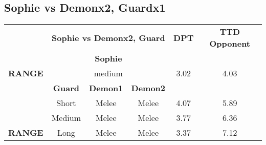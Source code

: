 \subsection{Sophie vs Demonx2, Guardx1}
\begin{table}[H]
\begin{tabular}{c|c|c|c|c|c|}
\cline{2-6}
\rowcolor[HTML]{C0C0C0} 
\cellcolor[HTML]{FFFFFF}\textbf{} & \multicolumn{3}{c|}{\cellcolor[HTML]{C0C0C0}\textbf{Sophie vs Demonx2, Guard}} & \textbf{DPT} & \textbf{TTD Opponent} \\ \cline{2-6} 
 & \multicolumn{3}{c|}{\textbf{Sophie}} & \multicolumn{2}{c|}{} \\ \hline
\multicolumn{1}{|c|}{\cellcolor[HTML]{C0C0C0}\textbf{RANGE}} & \multicolumn{3}{c|}{medium} & 3.02 & 4.03 \\ \hline
 & \textbf{Guard} & \textbf{Demon1} & \textbf{Demon2} & \multicolumn{2}{c|}{} \\ \hline
\multicolumn{1}{|c|}{\cellcolor[HTML]{C0C0C0}} & Short & Melee & Melee & 4.07 & 5.89 \\ \cline{2-6} 
\multicolumn{1}{|c|}{\cellcolor[HTML]{C0C0C0}} & Medium & Melee & Melee & 3.77 & 6.36 \\ \cline{2-6} 
\multicolumn{1}{|c|}{\cellcolor[HTML]{C0C0C0}\textbf{RANGE}} & Long & Melee & Melee & 3.37 & 7.12 \\ \hline
\end{tabular}
\end{table}
